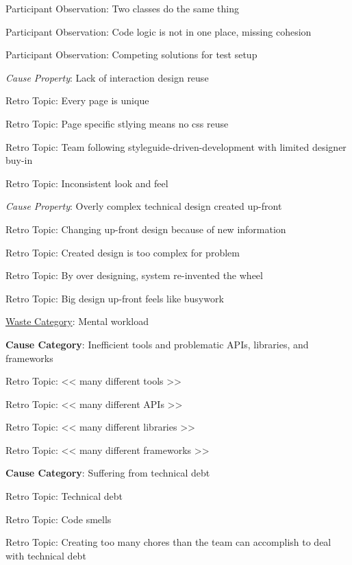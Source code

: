 \quad \quad \quad Participant Observation: Two classes do the same thing

\quad \quad \quad Participant Observation: Code logic is not in one place, missing cohesion

\quad \quad \quad Participant Observation: Competing solutions for test setup

\quad \quad \textit{Cause Property}: Lack of interaction design reuse

\quad \quad \quad Retro Topic: Every page is unique

\quad \quad \quad Retro Topic: Page specific stlying means no css reuse

\quad \quad \quad Retro Topic: Team following styleguide-driven-development with limited designer buy-in

\quad \quad \quad Retro Topic: Inconsistent look and feel

\quad \quad \textit{Cause Property}: Overly complex technical design created up-front

\quad \quad \quad Retro Topic: Changing up-front design because of new information

\quad \quad \quad Retro Topic: Created design is too complex for problem

\quad \quad \quad Retro Topic: By over designing, system re-invented the wheel

\quad \quad \quad Retro Topic: Big design up-front feels like busywork






\underline{Waste Category}: Mental workload

\quad \textbf{Cause Category}: Inefficient tools and problematic APIs, libraries, and frameworks

\quad \quad Retro Topic: << many different tools >>

\quad \quad Retro Topic: << many different APIs >>

\quad \quad Retro Topic: << many different libraries >>

\quad \quad Retro Topic: << many different frameworks >>

\quad \textbf{Cause Category}: Suffering from technical debt

\quad \quad Retro Topic: Technical debt

\quad \quad Retro Topic: Code smells

\quad \quad Retro Topic: Creating too many chores than the team can accomplish to deal with technical debt


